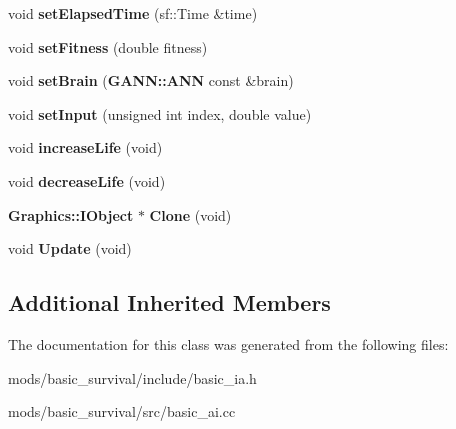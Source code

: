 \begin{DoxyCompactItemize}
\item 
void {\bfseries set\+Elapsed\+Time} (sf\+::\+Time \&time)\label{class_basic_a_i_a974ccf56612fa486d7c0b886c273edfd}

\item 
void {\bfseries set\+Fitness} (double fitness)\label{class_basic_a_i_aded3cdf2c30ea7465421f5824749ab58}

\item 
void {\bfseries set\+Brain} ({\bf G\+A\+N\+N\+::\+A\+N\+N} const \&brain)\label{class_basic_a_i_a5767c288c5b67e12911111b2ee81dc68}

\item 
void {\bfseries set\+Input} (unsigned int index, double value)\label{class_basic_a_i_ad0282057714372cfb26624a249937fc1}

\item 
void {\bfseries increase\+Life} (void)\label{class_basic_a_i_a344dcae800ad0959b259888b3534a7c2}

\item 
void {\bfseries decrease\+Life} (void)\label{class_basic_a_i_a7c2848663d66ad2ea600dd1f7989395e}

\item 
{\bf Graphics\+::\+I\+Object} $\ast$ {\bfseries Clone} (void)\label{class_basic_a_i_a80c73dc2b39751fd41dad0dba562a9a2}

\item 
void {\bfseries Update} (void)\label{class_basic_a_i_a742e5349916ff3149a234ef69c8b2fce}

\end{DoxyCompactItemize}
\subsection*{Additional Inherited Members}


The documentation for this class was generated from the following files\+:\begin{DoxyCompactItemize}
\item 
mods/basic\+\_\+survival/include/basic\+\_\+ia.\+h\item 
mods/basic\+\_\+survival/src/basic\+\_\+ai.\+cc\end{DoxyCompactItemize}
